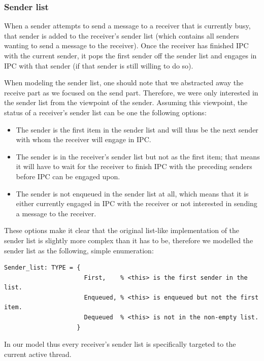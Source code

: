 \subsubsection{Sender list}
When a sender attempts to send a message to a receiver that is currently busy, that sender is added to the receiver's sender list (which contains all senders wanting to send a message to the receiver). Once the receiver has finished IPC with the current sender, it pops the first sender off the sender list and engages in IPC with that sender (if that sender is still willing to do so).\emptyline

When modeling the sender list, one should note that we abstracted away the receive part as we focused on the send part. Therefore, we were only interested in the sender list from the viewpoint of the sender. Assuming this viewpoint, the status of a receiver's sender list can be one the following options:

\begin{itemize}
 \item The sender is the first item in the sender list and will thus be the next sender with whom the receiver will engage in IPC.
 \item The sender is in the receiver's sender list but not as the first item; that means it will have to wait for the receiver to finish IPC with the preceding senders before IPC can be engaged upon. 
 \item The sender is not enqueued in the sender list at all, which means that it is either currently engaged in IPC with the receiver or not interested in sending a message to the receiver.
\end{itemize}

These options make it clear that the original list-like implementation of the sender list is slightly more complex than it has to be, therefore we modelled the sender list as the following, simple enumeration:

\lstset{language=PVS}
\begin{lstlisting}[caption={PVS: sender list definition.}]
Sender_list: TYPE = {
                      First,    % <this> is the first sender in the list.
                      Enqueued, % <this> is enqueued but not the first item.
                      Dequeued  % <this> is not in the non-empty list.
                    }
\end{lstlisting}

In our model thus every receiver's sender list is specifically targeted to the current active thread.

